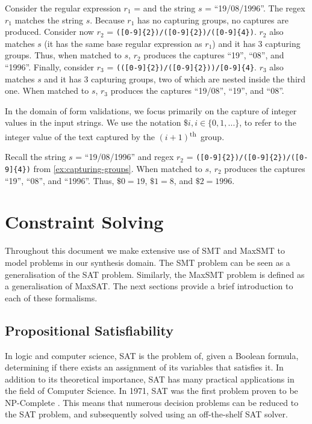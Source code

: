 \begin{example}\label{ex:capturing-groups}
Consider the regular expression \(r_1\) =  and the string \(s\) = ``19/08/1996''. The regex \(r_1\) matches the string \(s\). Because \(r_1\) has no capturing groups, no captures are produced.
%
Consider now \(r_2\) = \verb`([0-9]{2})/([0-9]{2})/([0-9]{4})`. \(r_2\) also matches \(s\) (it has the same base regular expression as \(r_1\)) and it has 3 capturing groups. Thus, when matched to \(s\), \(r_2\) produces the captures ``19'', ``08'', and ``1996''.
%
Finally, consider \(r_3\) = \verb`(([0-9]{2})/([0-9]{2}))/[0-9]{4}`. \(r_3\) also matches \(s\) and it has 3 capturing groups, two of which are nested inside the third one. When matched to \(s\), \(r_3\) produces the captures ``19/08'', ``19'', and ``08''.
\end{example}

\noindent
In the domain of form validations, we focus primarily on the capture of integer values in the input strings. We use the notation \(\$i, i \in \{0, 1, ...\}\), to refer to the integer value of the text captured by the \((i+1)\)\textsuperscript{th}~group.

\begin{example}
Recall the string \(s\) = ``19/08/1996'' and regex \(r_2\) = \verb`([0-9]{2})/([0-9]{2})/([0-9]{4})` from \autoref{ex:capturing-groups}. When matched to \(s\), \(r_2\) produces the captures ``19'', ``08'', and ``1996''. Thus, \(\$0 = 19\), \(\$1 = 8\), and \(\$2 = 1996\).
\end{example}

\section{Constraint Solving}\label{sec:logic}

Throughout this document we make extensive use of \ac{SMT} and \ac{MaxSMT} to model problems in our synthesis domain.
%
The \ac{SMT} problem can be seen as a generalisation of the \ac{SAT} problem. Similarly, the \ac{MaxSMT} problem is defined as a generalisation of \ac{MaxSAT}. The next sections provide a brief introduction to each of these formalisms.

\subsection{Propositional Satisfiability}

In logic and computer science, \ac{SAT} is the problem of, given a Boolean formula, determining if there exists an assignment of its variables that satisfies it.
%
In addition to its theoretical importance, \ac{SAT} has many practical applications in the field of Computer Science. In 1971, \ac{SAT} was the first problem proven to be NP-Complete \cite{DBLP:conf/stoc/Cook71}. This means that numerous decision problems can be reduced to the \ac{SAT} problem, and subsequently solved using an off-the-shelf \ac{SAT} solver.

